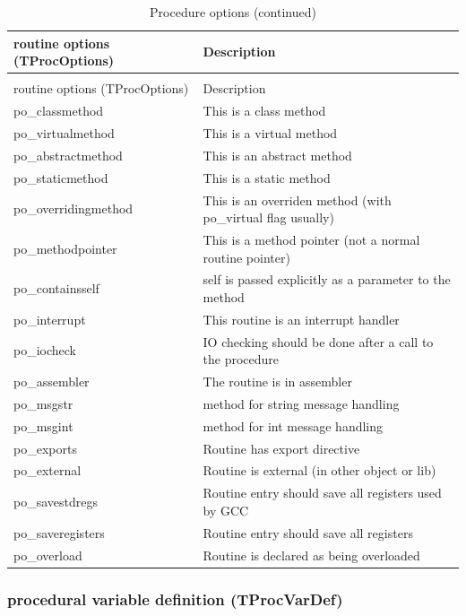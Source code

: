 \documentclass [a4paper,12pt]{article}
\begin{document}
\begin{longtable}{|l|p{10cm}|}
\caption{Procedure options}\label{tprocoptions}\\
\hline
routine options (TProcOptions) & Description \\
\hline
\endfirsthead
\caption{Procedure options (continued)}\\
\hline
routine options (TProcOptions) & Description \\
\hline
\endhead
\hline
\endfoot
\textsf{po{\_}classmethod}   & This is a class method \\
\textsf{po{\_}virtualmethod }& This is a virtual method \\
\textsf{po{\_}abstractmethod}& This is an abstract method \\
\textsf{po{\_}staticmethod}  & This is a static method \\
\textsf{po{\_}overridingmethod}&
    This is an overriden method (with po{\_}virtual flag usually) \\
\textsf{po{\_}methodpointer}&
    This is a method pointer (not a normal routine pointer) \\
\textsf{po{\_}containsself}&
    self is passed explicitly as a parameter to the method \\
\textsf{po{\_}interrupt}&
    This routine is an interrupt handler \\
\textsf{po{\_}iocheck}&
    IO checking should be done after a call to the procedure \\
\textsf{po{\_}assembler}&
    The routine is in assembler \\
\textsf{po{\_}msgstr}&
    method for string message handling \\
\textsf{po{\_}msgint}&
    method for int message handling \\
\textsf{po{\_}exports}&
    Routine has export directive  \\
\textsf{po{\_}external}&
    Routine is external (in other object or lib) \\
\textsf{po{\_}savestdregs}&
    Routine entry should save all registers used by GCC \\
\textsf{po{\_}saveregisters}&
    Routine entry should save all registers \\
\textsf{po{\_}overload}&
    Routine is declared as being overloaded \\
\end{longtable}

\subsubsection{procedural variable definition (TProcVarDef)}
\label{subsubsec:procedural}
\end{document}
